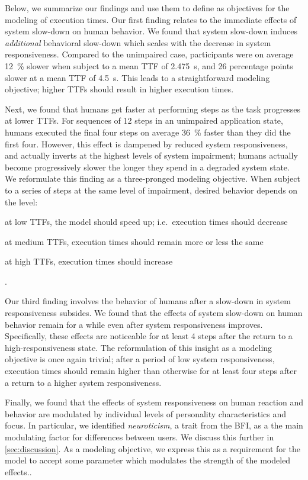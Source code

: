 Below, we summarize our findings and use them to define as objectives for the modeling of execution times.
Our first finding relates to the immediate effects of system slow-down on human behavior.
We found that system slow-down induces \emph{additional} behavioral slow-down which scales with the decrease in system responsiveness.
Compared to the unimpaired case, participants were on average \SI{12}{\percent} slower when subject to a mean \gls{TTF} of \SI{2.475}{\second}, and \num{26} percentage points slower at a mean \gls{TTF} of \SI{4.5}{\second}.
This leads to a straightforward modeling objective; higher \glspl{TTF} should result in higher execution times.

Next, we found that humans get faster at performing steps as the task progresses at lower \glspl{TTF}.
For sequences of \num{12} steps in an unimpaired application state, humans executed the final four steps on average \SI{36}{\percent} faster than they did the first four.
However, this effect is dampened by reduced system responsiveness, and actually inverts at the highest levels of system impairment;
humans actually become progressively slower the longer they spend in a degraded system state.
We reformulate this finding as a three-pronged modeling objective.
When subject to a series of steps at the same level of impairment, desired behavior depends on the level:
\begin{enumerate*}[itemjoin={{; }}, itemjoin*={{; and }}]
    \item at low \glspl{TTF}, the model should speed up; i.e.\ execution times should decrease
    \item at medium \glspl{TTF}, execution times should remain more or less the same
    \item at high \glspl{TTF}, execution times should increase
\end{enumerate*}.

Our third finding involves the behavior of humans after a slow-down in system responsiveness subsides.
We found that the effects of system slow-down on human behavior remain for a while even after system responsiveness improves.
Specifically, these effects are noticeable for at least \num{4} steps after the return to a high-responsiveness state.
The reformulation of this insight as a modeling objective is once again trivial; after a period of low system responsiveness, execution times should remain higher than otherwise for at least four steps after a return to a higher system responsiveness.

Finally, we found that the effects of system responsiveness on human reaction and behavior are modulated by individual levels of personality characteristics and focus.
In particular, we identified \emph{neuroticism}, a trait from the \gls{BFI}, as a the main modulating factor for differences between users.
We discuss this further in \cref{sec:discussion}.
As a modeling objective, we express this as a requirement for the model to accept some parameter which modulates the strength of the modeled effects..

